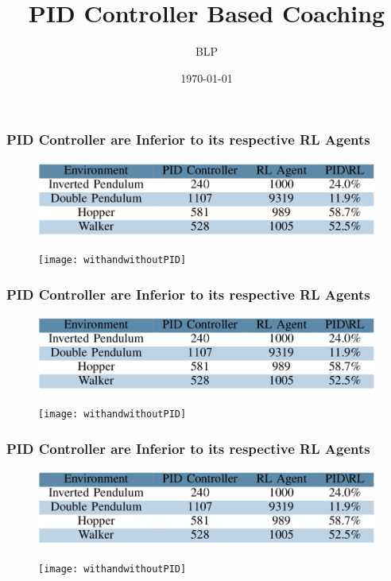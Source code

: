 \documentclass{beamer}
\title{PID Controller Based Coaching}
\author{BLP}
\institute{NJUPT}
\date{\today}
\begin{document}
\begin{frame}
\titlepage
\end{frame}


\begin{frame}
	\frametitle{PID Controller are Inferior to its respective RL Agents}
	\begin{figure}
        \centering
	    \includegraphics[scale=0.2]{PIDvsRL}
	\end{figure}
	\begin{figure}
        \centering
	    \texttt{[image: withandwithoutPID]}
    \end{figure}

\end{frame}

\begin{frame}
	\frametitle{PID Controller are Inferior to its respective RL Agents}
	\begin{figure}
        \centering
	    \includegraphics[scale=0.2]{PIDvsRL}
	\end{figure}
	\begin{figure}
        \centering
	    \texttt{[image: withandwithoutPID]}
    \end{figure}
\end{frame}

\begin{frame}
	\frametitle{PID Controller are Inferior to its respective RL Agents}
	\begin{figure}
        \centering
	    \includegraphics[scale=0.2]{PIDvsRL}
	\end{figure}
	\begin{figure}
        \centering
	    \texttt{[image: withandwithoutPID]}
    \end{figure}
\end{frame}
\end{document}

